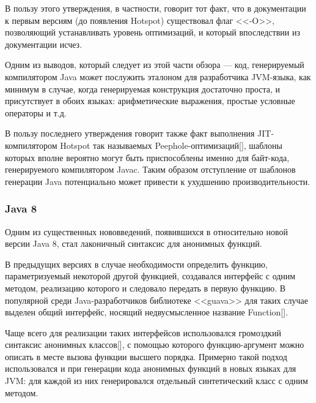 В пользу этого утверждения, в частности, говорит тот факт, что в документации к первым версиям
(до появления Hotspot) существовал флаг <<-O>>, позволяющий устанавливать уровень оптимизаций,
и который впоследствии из документации исчез.

Одним из выводов, который следует из этой части обзора --- код, генерируемый компилятором Java
может послужить эталоном для разработчика JVM-языка, как минимум в случае, когда
генерируемая конструкция достаточно проста, и присутствует в обоих языках: арифметические выражения,
простые условные операторы и т.д.

В пользу последнего утверждения говорит также факт выполнения JIT-компилятором Hotspot
так называемых Peephole-оптимизаций[], шаблоны которых вполне вероятно могут быть приспособлены
именно для байт-кода, генерируемого компилятором Javac. Таким образом отступление от шаблонов
генерации Java потенциально может привести к ухудшению производительности.

\subsubsection{Java 8}
Одним из существенных нововведений, появившихся в относительно новой версии Java 8, стал лаконичный
синтаксис для анонимных функций.

В предыдущих версиях в случае необходимости определить функцию, параметризуемый некоторой другой
функцией, создавался интерфейс с одним методом, реализацию которого и следовало передать в первую
функцию.
В популярной среди Java-разработчиков библиотеке <<guava>> для таких случае выделен общий
интерфейс, носящий недвусмысленное название Function[].

Чаще всего для реализации таких интерфейсов использовался громоздкий синтаксис анонимных классов[],
с помощью которого функцию-аргумент можно описать в месте вызова функции высшего порядка.
Примерно такой подход использовался и при генерации кода анонимных функций в новых языках для JVM:
для каждой из них генерировался отдельный синтетический класс с одним методом.


